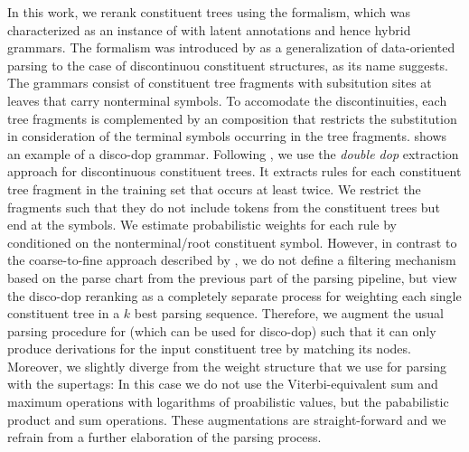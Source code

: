 \documentclass[../document.tex]{subfiles}
\begin{document}
    In this work, we rerank constituent trees using the  formalism, which was characterized as an instance of  with latent annotations \citep[cf.\@ section~4]{Cranenbourgh11} and hence hybrid grammars. \citep[cf.\@ section~8.5.1]{Geb20}
    The formalism was introduced by \citet{Cranenbourgh11} as a generalization of data-oriented parsing \citep{Bod02} to the case of discontinuou constituent structures, as its name suggests.
    The grammars consist of constituent tree fragments with subsitution sites at leaves that carry nonterminal symbols.
    To accomodate the discontinuities, each tree fragments is complemented by an  composition that restricts the substitution in consideration of the terminal symbols occurring in the tree fragments.
     shows an example of a disco-dop grammar.
    Following \citet{San11, Cranenbourgh16}, we use the \emph{double dop} extraction approach for discontinuous constituent trees.
    It extracts rules for each constituent tree fragment in the training set that occurs at least twice.
    We restrict the fragments such that they do not include tokens from the constituent trees but end at the  symbols.
    We estimate probabilistic weights for each rule by conditioned on the  nonterminal/root constituent symbol.
    However, in contrast to the coarse-to-fine approach described by \citet{Cra11}, we do not define a filtering mechanism based on the parse chart from the previous part of the parsing pipeline, but view the disco-dop reranking as a completely separate process for weighting each single constituent tree in a \(k\) best parsing sequence.
    Therefore, we augment the usual parsing procedure for  (which can be used for disco-dop) such that it can only produce derivations for the input constituent tree by matching its nodes.
    Moreover, we slightly diverge from the weight structure that we use for parsing with the supertags:
        In this case we do not use the Viterbi-equivalent sum and maximum operations with logarithms of proabilistic values, but the pababilistic product and sum operations.
    These augmentations are straight-forward and we refrain from a further elaboration of the parsing process.
    
\end{document}
